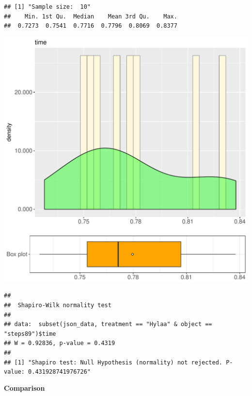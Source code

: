 \documentclass{article}\usepackage[]{graphicx}\usepackage[]{color}
\makeatletter
\def\maxwidth{ %
  \ifdim\Gin@nat@width>\linewidth
    \linewidth
  \else
    \Gin@nat@width
  \fi
}
\newenvironment{kframe}{%
 \def\at@end@of@kframe{}%
 \ifinner\ifhmode%
  \def\at@end@of@kframe{\end{minipage}}%
  \begin{minipage}{\columnwidth}%
 \fi\fi%
 \def\FrameCommand##1{\hskip\@totalleftmargin \hskip-\fboxsep
 \colorbox{shadecolor}{##1}\hskip-\fboxsep
     \hskip-\linewidth \hskip-\@totalleftmargin \hskip\columnwidth}%
 \MakeFramed {\advance\hsize-\width
   \@totalleftmargin\z@ \linewidth\hsize
   \@setminipage}}%
 {\par\unskip\endMakeFramed%
 \at@end@of@kframe}
\newenvironment{knitrout}{}{} %
\makeatother
\begin{document}
\begin{knitrout}
\color{fgcolor}\begin{kframe}
\begin{verbatim}
## [1] "Sample size:  10"
##    Min. 1st Qu.  Median    Mean 3rd Qu.    Max. 
##  0.7273  0.7541  0.7716  0.7796  0.8069  0.8377
\end{verbatim}
\end{kframe}
\includegraphics[width=\maxwidth]{figure/RH3_Hylaa_steps89-1} 
\begin{kframe}\begin{verbatim}
## 
## 	Shapiro-Wilk normality test
## 
## data:  subset(json_data, treatment == "Hylaa" & object == "steps89")$time
## W = 0.92836, p-value = 0.4319
## 
## [1] "Shapiro test: Null Hypothesis (normality) not rejected. P-value: 0.431928741976726"
\end{verbatim}
\end{kframe}
\end{knitrout}
  
 \textbf{Comparison}
  
\end{document}
